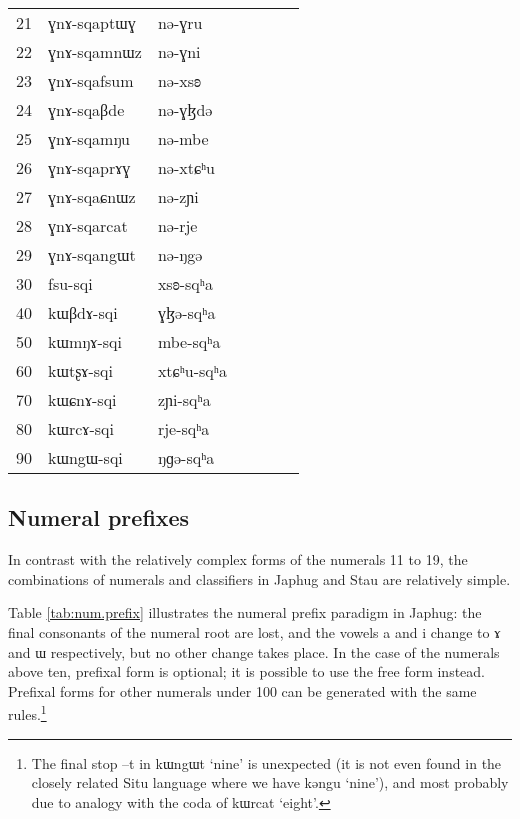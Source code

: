 \documentclass[oldfontcommands,oneside,a4paper,12pt]{article}
\newcommand{\ipa}[1]{{\phon#1}}
\begin{document}
\begin{table}[H]
\begin{tabular}{lllllll}
21	&	\ipa{ɣnɤ-sqaptɯɣ}  &	\ipa{nə-ɣru}  &	\\	
22	&	\ipa{ɣnɤ-sqamnɯz}  &	\ipa{nə-ɣni}  &	\\	
23	&	\ipa{ɣnɤ-sqafsum}  &	\ipa{nə-xsʚ}  &	\\	
24	&	\ipa{ɣnɤ-sqaβde}  &	\ipa{nə-ɣɮdə}  &	\\	
25	&	\ipa{ɣnɤ-sqamŋu}  &	\ipa{nə-mbe}  &	\\	
26	&	\ipa{ɣnɤ-sqaprɤɣ}  &	\ipa{nə-xtɕʰu}  &	\\	
27	&	\ipa{ɣnɤ-sqaɕnɯz}  &	\ipa{nə-zɲi}  &	\\	
28	&	\ipa{ɣnɤ-sqarcat}  &	\ipa{nə-rje}  &	\\	
29	&	\ipa{ɣnɤ-sqangɯt}  &	\ipa{nə-ŋgə}  &	\\	
\midrule					
30	&	\ipa{fsu-sqi}  &	\ipa{xsʚ-sqʰa}  &	\\	
40	&	\ipa{kɯβdɤ-sqi}  &	\ipa{ɣɮə-sqʰa}  &	\\	
50	&	\ipa{kɯmŋɤ-sqi}  &	\ipa{mbe-sqʰa}  &	\\	
60	&	\ipa{kɯtʂɤ-sqi}  &	\ipa{xtɕʰu-sqʰa}  &	\\	
70	&	\ipa{kɯɕnɤ-sqi}  &	\ipa{zɲi-sqʰa}  &	\\	
80	&	\ipa{kɯrcɤ-sqi}  &	\ipa{rje-sqʰa}  &	\\	
90	&	\ipa{kɯngɯ-sqi}  &	\ipa{ŋɡə-sqʰa}  &	\\	
\bottomrule
\end{tabular}
\end{table}
		


 \subsection{Numeral prefixes} \label{sec:prefixes.japhug}
 
 In contrast with the relatively complex forms of the numerals 11 to 19, the combinations of numerals and classifiers in Japhug and Stau are relatively simple. 
 
Table \ref{tab:num.prefix} illustrates the numeral prefix paradigm in Japhug: the final consonants of the numeral root are lost, and the vowels \ipa{a} and \ipa{i} change to \ipa{ɤ} and \ipa{ɯ} respectively, but no other change takes place. In the case of the numerals above ten, prefixal form is optional; it is possible to use the free form instead. Prefixal forms for other numerals under 100 can be generated with the same rules.\footnote{The final stop \ipa{--t} in \ipa{kɯngɯt} `nine' is unexpected (it is not even found in the closely related Situ language where we have \ipa{kəngu} `nine'), and most probably due to analogy with the coda of \ipa{kɯrcat}  `eight'.}
 
\end{document}
